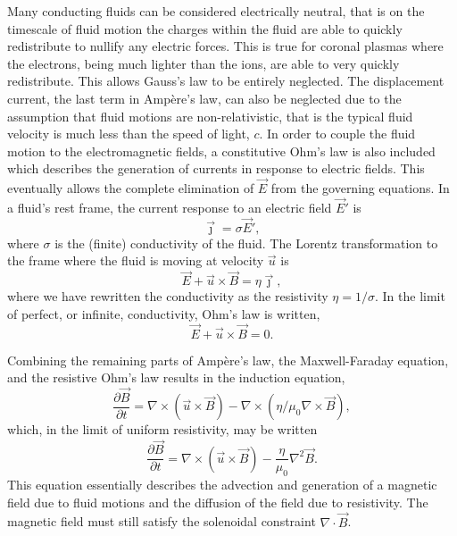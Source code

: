 Many conducting fluids can be considered electrically neutral, that is on the timescale of fluid motion the charges within the fluid are able to quickly redistribute to nullify any electric forces. This is true for coronal plasmas where the electrons, being much lighter than the ions, are able to very quickly redistribute. This allows Gauss's law to be entirely neglected. The displacement current, the last term in Ampère's law, can also be neglected due to the assumption that fluid motions are non-relativistic, that is the typical fluid velocity is much less than the speed of light, $c$. In order to couple the fluid motion to the electromagnetic fields, a constitutive Ohm's law is also included which describes the generation of currents in response to electric fields. This eventually allows the complete elimination of $\vec{E}$ from the governing equations. In a fluid's rest frame, the current response to an electric field $\vec{E}'$ is
\begin{equation}
  \label{eq:rest_frame_ohms_law}
  \vec{\jmath} = \sigma \vec{E}',
\end{equation}
where $\sigma$ is the (finite) conductivity of the fluid. The Lorentz transformation to the frame where the fluid is moving at velocity $\vec{u}$ is
\begin{equation}
  \label{eq:resistive_ohms_law}
  {\vec {E}}+{\vec{u}}\times {\vec {B}}=\eta{\vec {\jmath}},
\end{equation}
where we have rewritten the conductivity as the resistivity $\eta = 1/\sigma$. In the limit of perfect, or infinite, conductivity, Ohm's law is written,
\begin{equation}
  \label{eq:ideal_ohms_law}
  {\vec {E}}+{\vec{u}}\times {\vec {B}}=0.
\end{equation}

Combining the remaining parts of Ampère's law, the Maxwell-Faraday equation, and the resistive Ohm's law results in the induction equation,
\begin{equation}
  \label{eq:nonsimple_induction_equation}
{\frac {\partial \vec {B} }{\partial t}} = \nabla \times (\vec{u} \times \vec{B}) - \nabla \times (\eta/\mu_0 \nabla \times \vec{B}),
\end{equation}
which, in the limit of uniform resistivity, may be written
\begin{equation}
  \label{eq:induction_equation}
{\frac {\partial \vec {B} }{\partial t}} = \nabla \times (\vec{u} \times \vec{B}) - \frac{\eta}{\mu_0}\nabla^2 \vec{B}.
\end{equation}
This equation essentially describes the advection and generation of a magnetic field due to fluid motions and the diffusion of the field due to resistivity. The magnetic field must still satisfy the solenoidal constraint $\nabla \cdot \vec{B}$.

